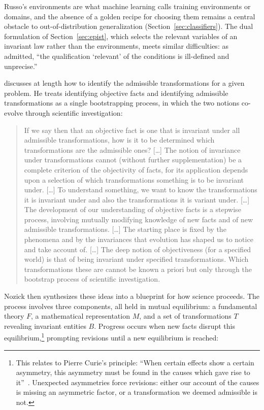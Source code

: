Russo's environments are what machine learning calls training environments or domains, and the absence of a golden recipe for choosing them remains a central obstacle to out-of-distribution generalization (Section~\ref{sec:classifiers}). The dual formulation of Section~\ref{sec:epist}, which selects the relevant variables of an invariant law rather than the environments, meets similar difficulties: as \citet[p.~31]{wigner1967} admitted, ``the qualification `relevant' of the conditions is ill-defined and unprecise.''

\citet{nozick2001} discusses at length how to identify the admissible transformations for a given problem. He treats identifying objective facts and identifying admissible transformations as a single bootstrapping process, in which the two notions co-evolve through scientific investigation:

\begin{quote}
If we say then that an objective fact is one that is invariant under all admissible transformations, how is it to be determined which transformations are the admissible ones? [\ldots] The notion of invariance under transformations cannot (without further supplementation) be a complete criterion of the objectivity of facts, for its application depends upon a selection of which transformations something is to be invariant under. [\ldots] To understand something, we want to know the transformations it is invariant under and also the transformations it is variant under. [\ldots] The development of our understanding of objective facts is a stepwise process, involving mutually modifying knowledge of new facts and of new admissible transformations. [\ldots] The starting place is fixed by the phenomena and by the invariances that evolution has shaped us to notice and take account of. [\ldots] The deep notion of objectiveness (for a specified world) is that of being invariant under specified transformations. Which transformations these are cannot be known a priori but only through the bootstrap process of scientific investigation. \citep[pp. 79--84]{nozick2001}
\end{quote}

Nozick then synthesizes these ideas into a blueprint for how science proceeds. The process involves three components, all held in mutual equilibrium: a fundamental theory $F$, a mathematical representation $M$, and a set of transformations $T$ revealing invariant entities $B$. Progress occurs when new facts disrupt this equilibrium,\footnote{This relates to Pierre Curie's principle: ``When certain effects show a certain asymmetry, this asymmetry must be found in the causes which gave rise to it''~\citep{curie}. Unexpected asymmetries force revisions: either our account of the causes is missing an asymmetric factor, or a transformation we deemed admissible is not.} prompting revisions until a new equilibrium is reached:

